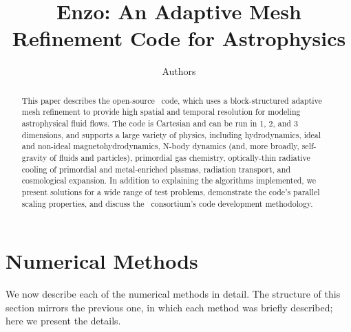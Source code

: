 \documentclass[onecolumn]{emulateapj}  %
\begin{document}
\title{Enzo: An Adaptive Mesh Refinement Code for Astrophysics}
\author{Authors}


\begin{abstract}
This paper describes the open-source \enzo\ code, which uses a
block-structured adaptive mesh refinement to provide high spatial and
temporal resolution for modeling astrophysical fluid flows.  The code
is Cartesian and can be run in 1, 2, and 3 dimensions, and supports a
large variety of physics, including hydrodynamics, ideal and non-ideal
magnetohydrodynamics, N-body dynamics (and, more broadly, self-gravity
of fluids and particles), primordial gas chemistry, optically-thin
radiative cooling of primordial and metal-enriched plasmas, radiation
transport, and cosmological expansion.  In addition to explaining the
algorithms implemented, we present solutions for a wide range of test
problems, demonstrate the code's parallel scaling properties, and
discuss the \enzo\ consortium's code development methodology.
\end{abstract}


\maketitle





\section{Numerical Methods}
\label{sec.methods}

We now describe each of the numerical methods in detail.  The structure of this section mirrors the previous one, in which each method was briefly described; here we present the details.
\end{document}
